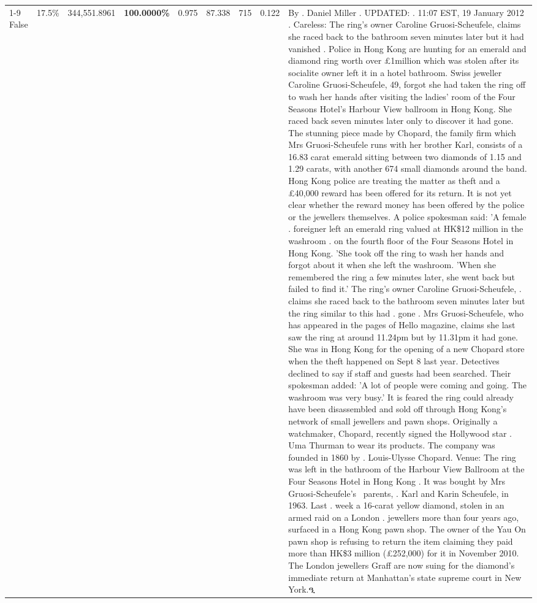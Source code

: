 \begin{table}[H]
\begin{tabular}{lllrlllll}
\cline{1-9} \cline{2-9}
False & 17.5\% & 344,551.8961 & \bfseries \color{red} 100.0000\% & 0.975 & 87.338 & 715 & 0.122 & By . Daniel Miller . UPDATED: . 11:07 EST, 19 January 2012 . Careless: The ring's owner Caroline Gruosi-Scheufele, claims she raced back to the bathroom seven minutes later but it had vanished . Police in Hong Kong are hunting for an emerald and diamond ring worth over £1million which was stolen after its socialite owner left it in a hotel bathroom. Swiss jeweller Caroline Gruosi-Scheufele, 49, forgot she had taken the ring off to wash her hands after visiting the ladies' room of the Four Seasons Hotel's Harbour View ballroom in Hong Kong. She raced back seven minutes later only to discover it had gone. The stunning piece made by Chopard, the family firm which Mrs Gruosi-Scheufele runs with her brother Karl, consists of a 16.83 carat emerald sitting between two diamonds of 1.15 and 1.29 carats, with another 674 small diamonds around the band. Hong Kong police are treating the matter as theft and a £40,000 reward has been offered for its return. It is not yet clear whether the reward money has been offered by the police or the jewellers themselves. A police spokesman said: 'A female . foreigner left an emerald ring valued at HK\$12 million in the washroom . on the fourth floor of the Four Seasons Hotel in Hong Kong. 'She took off the ring to wash her hands and forgot about it when she left the washroom. 'When she remembered the ring a few minutes later, she went back but failed to find it.' The ring's owner Caroline Gruosi-Scheufele, . claims she raced back to the bathroom seven minutes later but the ring similar to this had . gone . Mrs Gruosi-Scheufele, who has appeared in the pages of Hello magazine, claims she last saw the ring at around 11.24pm but by 11.31pm it had gone. She was in Hong Kong for the opening of a new Chopard store when the theft happened on Sept 8 last year. Detectives declined to say if staff and guests had been searched. Their spokesman added: 'A lot of people were coming and going. The washroom was very busy.' It is feared the ring could already have been disassembled and sold off through Hong Kong's network of small jewellers and pawn shops. Originally a watchmaker, Chopard, recently signed the Hollywood star . Uma Thurman to wear its products. The company was founded in 1860 by . Louis-Ulysse Chopard. Venue: The ring was left in the bathroom of the Harbour View Ballroom at the Four Seasons Hotel in Hong Kong . It was bought by Mrs Gruosi-Scheufele's  parents, . Karl and Karin Scheufele, in 1963. Last . week a 16-carat yellow diamond, stolen in an armed raid on a London . jewellers more than four years ago, surfaced in a Hong Kong pawn shop. The owner of the Yau On pawn shop is refusing to return the item claiming they paid more than HK\$3 million (£252,000) for it in November 2010. The London jewellers Graff are now suing for the diamond’s immediate return at Manhattan’s state supreme court in New York.ዒ \\

\end{tabular}
\end{table}
